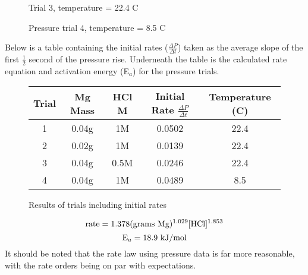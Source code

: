 \documentclass[12pt, letterpaper]{article}
\begin{document}
\begin{figure}[h!]
\centering
\begin{minipage}{0.5\textwidth}%
		\raggedright
    	\resizebox{0.9\textwidth}{!}{}
  \caption{Trial 3, temperature = 22.4 \textdegree C}
\label{fig:05m4}
\end {minipage}%
\hfill%
\begin{minipage}{0.5\textwidth}%
  \raggedleft
    	\resizebox{0.9\textwidth}{!}{}
  \caption{Pressure trial 4, temperature = 8.5 \textdegree C }
\label{fig:1m4c}
\end {minipage}
\end {figure}
\FloatBarrier

Below is a table containing the initial rates ($\frac{\Delta P}{\Delta t}$) taken as the average slope of the first $\frac{1}{2}$ second of the pressure rise. Underneath the table is the calculated rate equation and activation energy (E$_a$) for the pressure trials.

\FloatBarrier
\begin{figure}[h!]
	\begin{center}
	\renewcommand\arraystretch{1.5}
	\renewcommand\tabcolsep{12pt}
		\begin{tabular}{|c|c|c|c|c|}
			\hline 
			Trial & Mg Mass & HCl M & Initial Rate $\frac{\Delta P}{\Delta t}$ & Temperature (\textdegree C)\\
			\hline 
			1 & 0.04g & 1M & 0.0502 & 22.4 \\
	 		\hline
			2 & 0.02g & 1M & 0.0139 & 22.4\\
	 		\hline
			3 & 0.04g & 0.5M & 0.0246 & 22.4\\
	 		\hline	
			4 & 0.04g & 1M & 0.0489 & 8.5\\
	 		\hline		 				 			 		
		\end{tabular}
	\end{center}
	\label{fig:prestab}
	\caption{Results of trials including initial rates}
\end{figure}
\FloatBarrier
\begin{equation}
\textnormal{rate}  = 1.378 (\textnormal{grams Mg})^{1.029} [\textnormal{HCl}]^{1.853}
\label{eq:presrate}
\end{equation}
\begin{equation}
\textnormal{E}_a = 18.9\textnormal{\space kJ/mol}
\label{Ea}
\end{equation}
It should be noted that the rate law using pressure data is far more reasonable, with the rate orders being on par with expectations.
\end{document}
